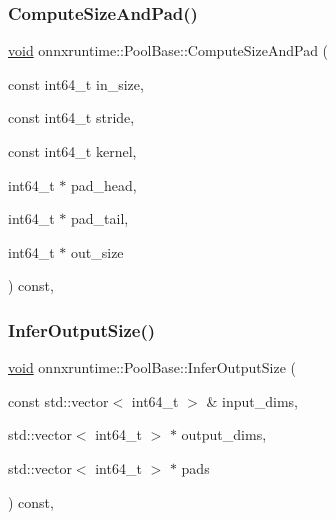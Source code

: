 \mbox{\label{classonnxruntime_1_1PoolBase_ab9c9f378646859e71ecd332088797b6a}} 
\subsubsection{\texorpdfstring{Compute\+Size\+And\+Pad()}{ComputeSizeAndPad()}}
{\footnotesize\ttfamily \mbox{\hyperlink{mlasi_8h_a88f941d423cb2a819b70a1358982b1a6}{void}} onnxruntime\+::\+Pool\+Base\+::\+Compute\+Size\+And\+Pad (\begin{DoxyParamCaption}\item[{const int64\+\_\+t}]{in\+\_\+size,  }\item[{const int64\+\_\+t}]{stride,  }\item[{const int64\+\_\+t}]{kernel,  }\item[{int64\+\_\+t $\ast$}]{pad\+\_\+head,  }\item[{int64\+\_\+t $\ast$}]{pad\+\_\+tail,  }\item[{int64\+\_\+t $\ast$}]{out\+\_\+size }\end{DoxyParamCaption}) const\hspace{0.3cm}{\ttfamily [inline]}, {\ttfamily [protected]}}

\mbox{\label{classonnxruntime_1_1PoolBase_ab49048558a89a492f93cc36f5e7ab599}} 
\subsubsection{\texorpdfstring{Infer\+Output\+Size()}{InferOutputSize()}}
{\footnotesize\ttfamily \mbox{\hyperlink{mlasi_8h_a88f941d423cb2a819b70a1358982b1a6}{void}} onnxruntime\+::\+Pool\+Base\+::\+Infer\+Output\+Size (\begin{DoxyParamCaption}\item[{const std\+::vector$<$ int64\+\_\+t $>$ \&}]{input\+\_\+dims,  }\item[{std\+::vector$<$ int64\+\_\+t $>$ $\ast$}]{output\+\_\+dims,  }\item[{std\+::vector$<$ int64\+\_\+t $>$ $\ast$}]{pads }\end{DoxyParamCaption}) const\hspace{0.3cm}{\ttfamily [inline]}, {\ttfamily [protected]}}

